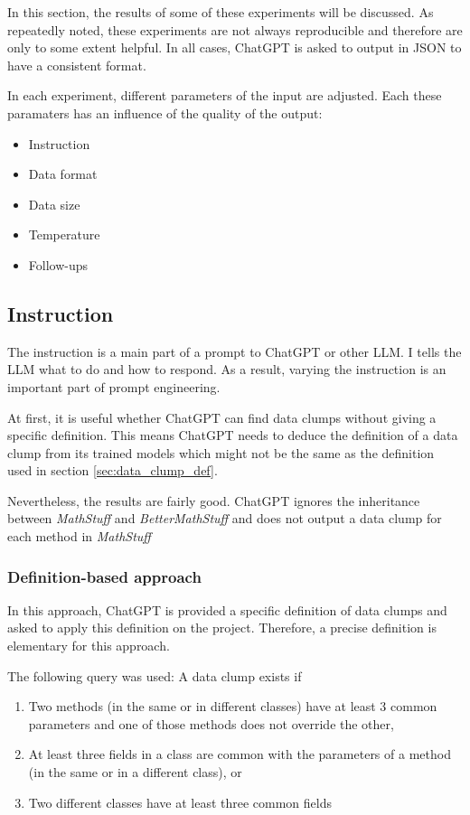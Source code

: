 In this section, the results of some of these experiments will be discussed.  As repeatedly noted, these experiments are not always reproducible and therefore are only to some extent helpful. In all cases, ChatGPT is asked to output in \ac{JSON} to have a consistent format.

In each experiment, different parameters of the input are adjusted. Each these paramaters has an influence of the quality of the output:

\begin{itemize}
    \item Instruction
    \item Data format
    \item Data size
    \item Temperature
    \item Follow-ups
\end{itemize}

\subsection{Instruction}\label{sec:llm_instruction}
The instruction is a main part of a prompt to ChatGPT or other \ac{LLM}. I tells the  \ac{LLM} what to do and how to respond. As a result, varying the instruction is an important part of prompt engineering. 


At first, it is useful whether ChatGPT can find data clumps without giving a specific definition. This means ChatGPT needs to deduce the definition of a data clump from its trained models which might not be the same as the definition used in section \ref{sec:data_clump_def}.

Nevertheless, the results are fairly good. ChatGPT ignores the inheritance between \textit{MathStuff} and \textit{BetterMathStuff} and does not output a data clump for each method in \textit{MathStuff}

\subsubsection{Definition-based approach}
In this approach, ChatGPT is provided a specific definition of data clumps and asked to apply this definition on the project. Therefore, a precise definition is elementary for this approach.

The following query was used:
A data clump exists if
\begin{enumerate}
\item  Two methods (in the same or in different classes) have at least 3 common parameters
    and one of those methods does not override the other, 
\item At least three fields in a class are common with the parameters of a method (in the same or in a different class), or 
\item Two different classes have at least three common fields
\end{enumerate}

